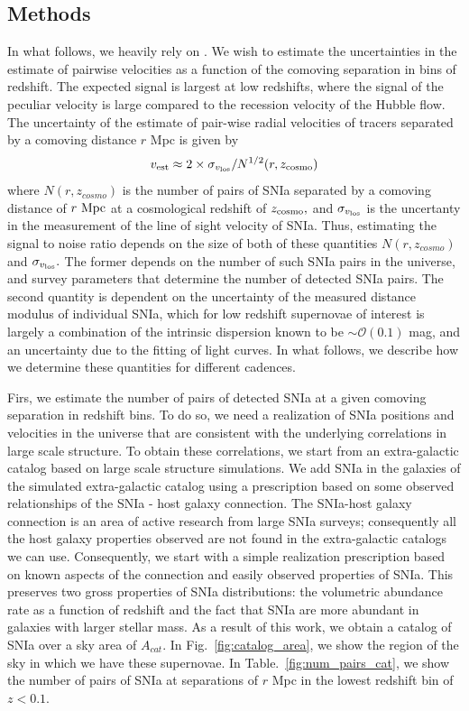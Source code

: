 \subsection{Methods}
In what follows, we heavily rely on \cite{2011PhRvD..83d3004B}. We wish to estimate the uncertainties in the estimate of pairwise velocities as a function of the comoving separation in bins of redshift. The expected signal is largest at low redshifts, where the signal of the peculiar velocity is large compared to the recession velocity of the Hubble flow.  The uncertainty of the estimate of pair-wise radial velocities of tracers separated by a comoving distance $r$ Mpc is given by
\begin{equation}
v_{\rm{est}} \approx 2 \times \sigma_{v_{\rm{los}}} / N^{1/2}(r, z_{\rm{cosmo}})
\end{equation}
where $N(r,z_{cosmo})$ is the number of pairs of SNIa separated by a comoving distance of $r~\rm{Mpc}$
at a cosmological redshift of $z_{\rm{cosmo}},$ and $\sigma_{v_{\rm{los}}}$ is the uncertanty in the
measurement of the line of sight velocity of SNIa. Thus, estimating the signal to noise ratio depends on the size of both of these quantities $N(r, z_{cosmo})$ and $\sigma_{v_{\rm{los}}}.$ The former depends on the number of such SNIa pairs in the universe, and  survey parameters that determine the number of detected SNIa pairs. The second quantity is dependent on the uncertainty of the measured distance modulus of individual SNIa, which for low redshift supernovae of interest is largely a combination of the intrinsic dispersion known to be $\sim \mathcal{O}(0.1)$ mag, and an uncertainty due to the fitting of light curves. In what follows, we describe how we determine these quantities for different cadences. 

Firs, we estimate the number of pairs of detected SNIa at a given comoving separation in redshift bins. To do so, we need a realization of SNIa positions and velocities in the universe that are consistent with the underlying correlations in large scale structure. To obtain these correlations, we start from an extra-galactic catalog based on large scale structure simulations. We add SNIa in the galaxies of the simulated extra-galactic catalog using a prescription based on some observed relationships of the SNIa - host galaxy connection. The SNIa-host galaxy connection is an area of active research from large SNIa surveys; consequently all the host galaxy properties observed are not found in the extra-galactic catalogs we can use. Consequently, we start with a simple realization prescription based on known aspects of the connection and easily observed properties of SNIa. This preserves two gross properties of SNIa distributions: the volumetric abundance rate as a function of redshift and the fact that SNIa are more abundant in galaxies with larger stellar mass. As a result of this work, we obtain a catalog of SNIa over a sky area of $A_{cat}.$ In Fig.~\ref{fig:catalog_area}, we show the region of the sky in which we have these supernovae. In Table.~\ref{fig:num_pairs_cat}, we show the number of pairs of SNIa at separations of $r $ Mpc in the lowest redshift bin of $z < 0.1.$

